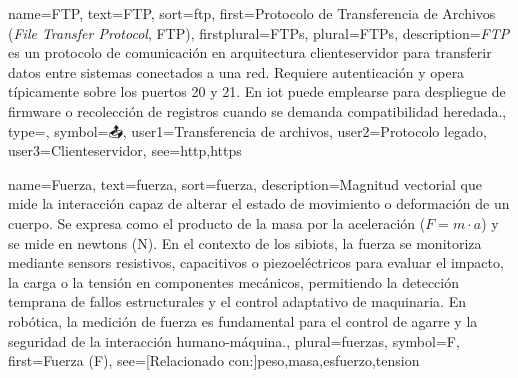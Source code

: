 	{
		name={FTP},
		text={FTP},
		sort={ftp},
		first={Protocolo de Transferencia de Archivos (\textit{File Transfer Protocol}, FTP)},
		firstplural={FTPs},
		plural={FTPs},
		description={\emph{FTP} es un protocolo de comunicaci{\'o}n en arquitectura \gls{cliente}\textendash\gls{servidor} para transferir \glspl{dato} entre sistemas conectados a una \gls{red}. Requiere autenticaci{\'o}n y opera t{\'i}picamente sobre los \glspl{puerto} 20 y 21. En \gls{iot} puede emplearse para despliegue de firmware o recolecci{\'o}n de registros cuando se demanda compatibilidad heredada.},
		type=\glsdefaulttype,
		symbol={📤},
		user1={Transferencia de archivos},
		user2={Protocolo legado},
		user3={Cliente\textendash servidor},
		see={http,https}
	}
	
	
	{
		name={Fuerza},
		text={fuerza},
		sort={fuerza},
		description={Magnitud vectorial que mide la interacci{\'o}n capaz de alterar el estado de movimiento o deformaci{\'o}n de un cuerpo. 
			Se expresa como el producto de la masa por la aceleraci{\'o}n (\ensuremath{F = m \cdot a}) y se mide en newtons (N). 
			En el contexto de los \glspl{sibiot}, la fuerza se monitoriza mediante \glspl{sensor} resistivos, capacitivos o piezoel{\'e}ctricos para evaluar el impacto, la carga o la tensi{\'o}n en componentes mec{\'a}nicos, permitiendo la detecci{\'o}n temprana de fallos estructurales y el control adaptativo de maquinaria. 
			En rob{\'o}tica, la medici{\'o}n de fuerza es fundamental para el control de agarre y la seguridad de la interacci{\'o}n humano-m{\'a}quina.},
		plural={fuerzas},
		symbol={F},
		first={Fuerza (F)},
		see=[Relacionado con:]{peso,masa,esfuerzo,tension}
	}
	
